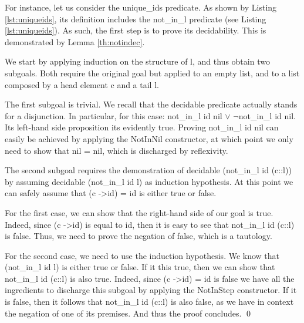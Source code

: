 		For instance, let us consider the \textsf{unique\_ids} predicate. As shown by Listing
		\ref{lst:uniqueids}, its definition includes the \textsf{not\_in\_l} predicate (see Listing \ref{lst:uniqueids}). As such,
		the first step is to prove its decidability. This is demonstrated by Lemma \ref{th:notindec}. 
				
		\begin{lemma} \label{th:notindec} 
				
		
			We start by applying induction on the structure of \textsf{l}, and thus
		obtain two subgoals. Both require the original goal but applied 		
		to an empty list, and to a list composed by a head element \textsf{c}
		and a tail \textsf{l}.
		
			The first subgoal is trivial. We recall that the \textsf{decidable} predicate 
		actually stands for a disjunction. In particular, for this 
		case: \textsf{not\_in\_l id nil $\lor$ $\neg$not\_in\_l id nil}. Its left-hand side
		proposition its evidently true. Proving \textsf{not\_in\_l id nil} can easily be achieved by applying
		the \textsf{NotInNil} constructor, at which point we only need to show that
		\textsf{nil = nil}, which is discharged by reflexivity. 
		
			The second subgoal requires the demonstration of \textsf{decidable (not\_in\_l id (c::l))} by assuming
		\textsf{decidable (not\_in\_l id l)} as induction hypothesis. At this point we can safely assume that
		\textsf{(c ->id) = id} is either true or false. 
		
		For the first case, we can show that the right-hand side
		of our goal is true. Indeed, since \textsf{(c ->id)} is equal to \textsf{id}, then it is easy to see that
		\textsf{not\_in\_l id (c::l)} is false. Thus, we need to prove the negation of false, which is a		
		tautology. 
		
		For the second case, we need to use the induction hypothesis. We  know that 
		\textsf{(not\_in\_l id l)} is either true or false. If it this true, then we can show that
		\textsf{not\_in\_l id (c::l)} is also true. Indeed, since \textsf{(c ->id) = id} is false
		we have all the ingredients to discharge this subgoal by applying the \textsf{NotInStep} 
		constructor. If it is false, then it follows that \textsf{not\_in\_l id (c::l)} is also false, as we
		have in context the negation of one of its premises. And thus the proof concludes. \qed		
		\end{lemma}
				
